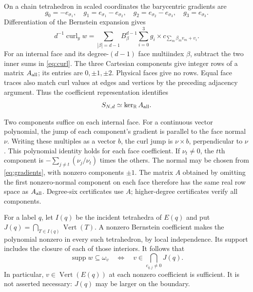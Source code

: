 \documentclass[11pt]{article}
\theoremstyle{remark}
\DeclareMathOperator{\curl}{curl}
\DeclareMathOperator{\supp}{supp}
\DeclareMathOperator{\vertices}{Vert}
\newcommand{\R}{\mathbb R}
\begin{document}
On a chain tetrahedron in scaled coordinates the barycentric gradients are
\begin{equation}\label{eq:gradients}
 g_0=-e_{\sigma_1},\quad g_1=e_{\sigma_1}-e_{\sigma_2},\quad
 g_2=e_{\sigma_2}-e_{\sigma_3},\quad g_3=e_{\sigma_3}.
\end{equation}
Differentiation of the Bernstein expansion gives
\begin{equation}\label{eq:curl}
 d^{-1}\curl_y w
   =\sum_{|\beta|=d-1}B^{d-1}_\beta
      \sum_{i=0}^3g_i\times c_{\sum_m\beta_m v_m+v_i}.
\end{equation}
For an internal face and its degree-$(d-1)$ face multiindex $\beta$,
subtract the two inner sums in \eqref{eq:curl}. The three Cartesian
components give integer rows of a matrix $A_{\rm all}$; its entries are
$0,\pm1,\pm2$. Physical faces give no rows. Equal face traces also match
curl values at edges and vertices by the preceding adjacency argument.
Thus the coefficient representation identifies
\begin{equation}\label{eq:kernel}
 S_{N,d}\simeq\ker_\R A_{\rm all}.
\end{equation}

Two components suffice on each internal face. For a continuous vector
polynomial, the jump of each component's gradient is parallel to the face
normal $\nu$. Writing these multiples as a vector $b$, the curl jump is
$\nu\times b$, perpendicular to $\nu$. This polynomial identity holds
for each face coefficient. If $\nu_t\ne0$, the $t$th component is
$-\sum_{j\ne t}(\nu_j/\nu_t)$ times the others. The normal may be chosen
from \eqref{eq:gradients}, with nonzero components $\pm1$. The matrix $A$
obtained by omitting the first nonzero-normal component on each face
therefore has the same real row space as $A_{\rm all}$. Degree-six
certificates use $A$; higher-degree certificates verify all components.

For a label $q$, let $I(q)$ be the incident tetrahedra of $E(q)$ and put
$J(q)=\bigcap_{T\in I(q)}\vertices(T)$. A nonzero Bernstein coefficient
makes the polynomial nonzero in every such tetrahedron, by local
independence. Its support includes the closure of each of those interiors.
It follows that
\begin{equation}\label{eq:support}
 \supp w\subseteq\omega_v
 \quad\Longleftrightarrow\quad
 v\in\bigcap_{c_{q,j}\ne0}J(q).
\end{equation}
In particular, $v\in\vertices(E(q))$ at each nonzero coefficient is sufficient.
It is not asserted necessary: $J(q)$ may be larger on the boundary.
\end{document}
